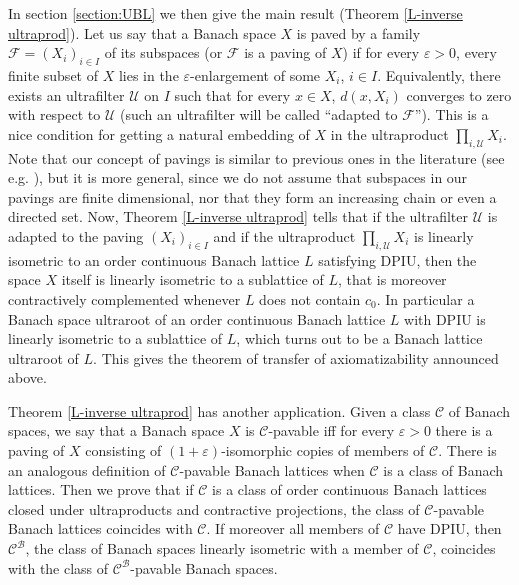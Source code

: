 \documentclass[11pt]{amsart}
\theoremstyle{plain}
\theoremstyle{remark}
\newcommand{\C}{\mathcal C}
\newcommand{\F}{\mathcal F}
\newcommand{\U}{\mathcal U}
\newcommand{\eps}{\varepsilon}
\begin{document}
In section \ref{section:UBL} we then give the main result (Theorem \ref{L-inverse ultraprod}). Let us say that a Banach space $X$ is paved by a family $\mathcal F=(X_i)_{i\in I}$ of its subspaces (or $\F$ is a paving of $X$) if for every $\eps>0$, every finite subset of $X$ lies in the $\eps$-enlargement of some $X_i$, $i\in I$. Equivalently, there exists an ultrafilter $\U$ on $I$ such that  for every $x\in X$, $d(x,X_i)$ converges to zero with respect to $\U$ (such an ultrafilter will be called ``adapted to $\F$''). This is a nice condition for getting a natural embedding of $X$ in the ultraproduct $\prod_{i,\U} X_i$. Note that our concept of pavings is similar to previous ones in the literature (see e.g. \cite{JLS}), but it is more general, since we do not assume that  subspaces in our pavings are finite dimensional, nor that they form an increasing chain or even a directed set.  Now, Theorem \ref{L-inverse ultraprod} tells that if  the ultrafilter $\U$ is adapted to the paving $(X_i)_{i\in I}$ and if the ultraproduct $\prod_{i,\U} X_i$  is linearly isometric to an order continuous Banach lattice $L$ satisfying DPIU, then the space $X$ itself is linearly isometric to a  sublattice of $L$, that is moreover contractively complemented whenever $L$ does not contain $c_0$. In particular a Banach space  ultraroot of an order continuous Banach lattice $L$ with DPIU is linearly isometric to a sublattice of $L$, which turns out to be  a Banach lattice ultraroot of $L$. This gives the theorem of transfer of axiomatizability announced  above.

Theorem \ref{L-inverse ultraprod} has another application. Given a class $\C$ of Banach spaces,  we say that a Banach space $X$ is $\C$-pavable iff for every $\eps>0$ there is a paving of $X$ consisting of $(1+\eps)$-isomorphic copies of members of $\C$. There is an analogous definition of $\C$-pavable Banach lattices when $\C$ is a class of Banach lattices. Then we prove that if $\C$ is a class of order continuous Banach lattices closed under ultraproducts and contractive projections, the class of $\C$-pavable Banach lattices coincides with $\C$. If moreover all members of $\C$ have DPIU, then $\C^\mathcal B$, the class of Banach spaces linearly isometric with a member of $\mathcal C$, coincides with the class of $\C^\mathcal B$-pavable Banach spaces.  
\end{document}
